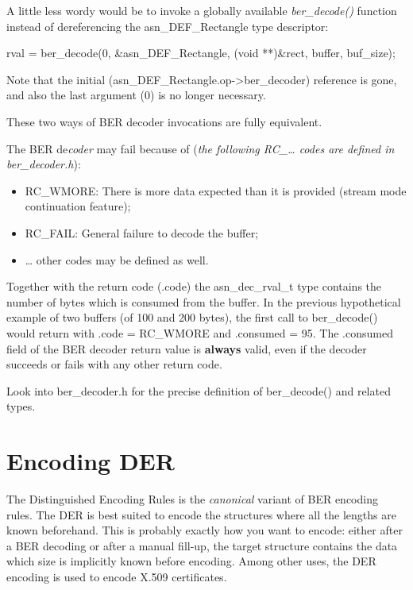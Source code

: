 \documentclass[english,oneside,12pt]{book}
\begin{document}
A little less wordy would be to invoke a globally available \emph{ber\_decode()}
function instead of dereferencing the asn\_DEF\_Rectangle type descriptor:
\begin{codesample}
rval = ber_decode(0, &asn_DEF_Rectangle, (void **)&rect, buffer, buf_size);
\end{codesample}
Note that the initial (asn\_DEF\_Rectangle.op->ber\_decoder) reference
is gone, and also the last argument (0) is no longer necessary.

These two ways of BER decoder invocations are fully equivalent.

The BER de\emph{coder} may fail because of (\emph{the following RC\_\ldots{}
codes are defined in ber\_decoder.h}):
\begin{itemize}
\item RC\_WMORE: There is more data expected than it is provided (stream
mode continuation feature);
\item RC\_FAIL: General failure to decode the buffer;
\item \ldots{} other codes may be defined as well.
\end{itemize}
Together with the return code (.code) the asn\_dec\_rval\_t type contains
the number of bytes which is consumed from the buffer. In the previous
hypothetical example of two buffers (of 100 and 200 bytes), the first
call to ber\_decode() would return with .code = RC\_WMORE and .consumed
= 95. The .consumed field of the BER decoder return value is \textbf{always}
valid, even if the decoder succeeds or fails with any other return
code.

Look into ber\_decoder.h for the precise definition of ber\_decode()
and related types.


\section{\label{sec:Encoding-DER}Encoding DER}

The Distinguished Encoding Rules is the \emph{canonical} variant of
BER encoding rules. The DER is best suited to encode the structures
where all the lengths are known beforehand. This is probably exactly
how you want to encode: either after a BER decoding or after a manual
fill-up, the target structure contains the data which size is implicitly
known before encoding. Among other uses, the DER encoding is used
to encode X.509 certificates.
\end{document}
